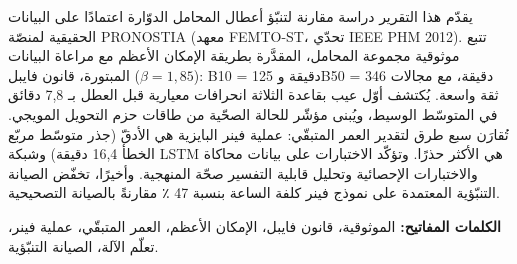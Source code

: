 \par\medskip

يقدّم هذا التقرير دراسة مقارنة لتنبّؤ أعطال المحامل الدوّارة اعتمادًا على البيانات الحقيقية لمنصّة PRONOSTIA (معهد FEMTO-ST، تحدّي IEEE PHM 2012). تتبع موثوقية مجموعة المحامل، المقدَّرة بطريقة الإمكان الأعظم مع مراعاة البيانات المبتورة، قانون فايبل ($\beta = 1{,}85$): B10 = 125 دقيقة وB50 = 346 دقيقة، مع مجالات ثقة واسعة. يُكتشف أوّل عيب بقاعدة الثلاثة انحرافات معيارية قبل العطل بـ 7,8 دقائق في المتوسّط الوسيط، ويُبنى مؤشّر للحالة الصحّية من طاقات حزم التحويل المويجي. تُقارَن سبع طرق لتقدير العمر المتبقّي: عملية فينر البايزية هي الأدقّ (جذر متوسّط مربّع الخطأ 16,4 دقيقة) وشبكة LSTM هي الأكثر حذرًا. وتؤكّد الاختبارات على بيانات محاكاة والاختبارات الإحصائية وتحليل قابلية التفسير صحّة المنهجية. وأخيرًا، تخفّض الصيانة التنبّؤية المعتمدة على نموذج فينر كلفة الساعة بنسبة 47 ٪ مقارنةً بالصيانة التصحيحية.

\textbf{الكلمات المفاتيح:} الموثوقية، قانون فايبل، الإمكان الأعظم، العمر المتبقّي، عملية فينر، تعلّم الآلة، الصيانة التنبّؤية.
